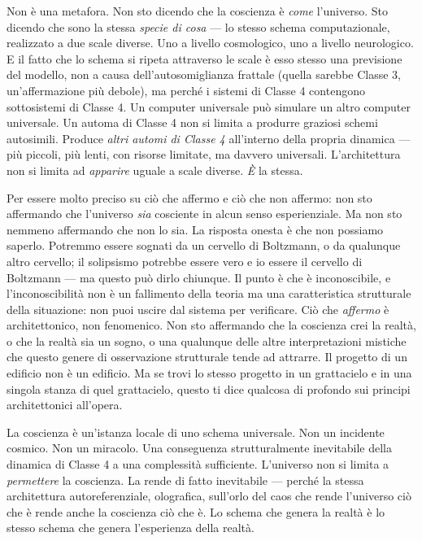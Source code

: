 \documentclass[11pt, twoside, openright]{book}
\begin{document}
Non è una metafora. Non sto dicendo che la coscienza è \textit{come} l'universo. Sto dicendo che sono la stessa \textit{specie di cosa} --- lo stesso schema computazionale, realizzato a due scale diverse. Uno a livello cosmologico, uno a livello neurologico. E il fatto che lo schema si ripeta attraverso le scale è esso stesso una previsione del modello, non a causa dell'autosomiglianza frattale (quella sarebbe Classe 3, un'affermazione più debole), ma perché i sistemi di Classe 4 contengono sottosistemi di Classe 4. Un computer universale può simulare un altro computer universale. Un automa di Classe 4 non si limita a produrre graziosi schemi autosimili. Produce \textit{altri automi di Classe 4} all'interno della propria dinamica --- più piccoli, più lenti, con risorse limitate, ma davvero universali. L'architettura non si limita ad \textit{apparire} uguale a scale diverse. \textit{È} la stessa.

Per essere molto preciso su ciò che affermo e ciò che non affermo: non sto affermando che l'universo \textit{sia} cosciente in alcun senso esperienziale. Ma non sto nemmeno affermando che non lo sia. La risposta onesta è che non possiamo saperlo. Potremmo essere sognati da un cervello di Boltzmann, o da qualunque altro cervello; il solipsismo potrebbe essere vero e io essere il cervello di Boltzmann --- ma questo può dirlo chiunque. Il punto è che è inconoscibile, e l'inconoscibilità non è un fallimento della teoria ma una caratteristica strutturale della situazione: non puoi uscire dal sistema per verificare. Ciò che \textit{affermo} è architettonico, non fenomenico. Non sto affermando che la coscienza crei la realtà, o che la realtà sia un sogno, o una qualunque delle altre interpretazioni mistiche che questo genere di osservazione strutturale tende ad attrarre. Il progetto di un edificio non è un edificio. Ma se trovi lo stesso progetto in un grattacielo e in una singola stanza di quel grattacielo, questo ti dice qualcosa di profondo sui principi architettonici all'opera.

La coscienza è un'istanza locale di uno schema universale. Non un incidente cosmico. Non un miracolo. Una conseguenza strutturalmente inevitabile della dinamica di Classe 4 a una complessità sufficiente. L'universo non si limita a \textit{permettere} la coscienza. La rende di fatto inevitabile --- perché la stessa architettura autoreferenziale, olografica, sull'orlo del caos che rende l'universo ciò che è rende anche la coscienza ciò che è. Lo schema che genera la realtà è lo stesso schema che genera l'esperienza della realtà.
\end{document}
